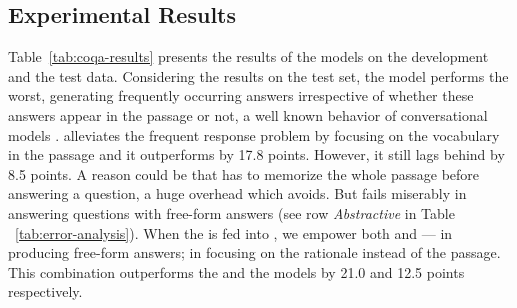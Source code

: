 \subsection{Experimental Results}
Table~\ref{tab:coqa-results} presents the results of the models on the development and the test data. Considering the results on the test set, the  model performs the worst, generating frequently occurring answers irrespective of whether these answers appear in the passage or not, a well known behavior of conversational models \cite{li2016diversity}.  alleviates the frequent response problem by focusing on the vocabulary in the passage and it outperforms  by 17.8 points. However, it still lags behind  by 8.5 points.
A reason could be that  has to memorize the whole passage before answering a question, a huge overhead which  avoids. But  fails miserably in answering questions with free-form answers (see row \textit{Abstractive} in Table ~\ref{tab:error-analysis}).
When the  is fed into , we empower both  and  ---  in producing free-form answers;  in focusing on the rationale instead of the passage. This combination outperforms the  and the  models by 21.0 and 12.5 points respectively.

